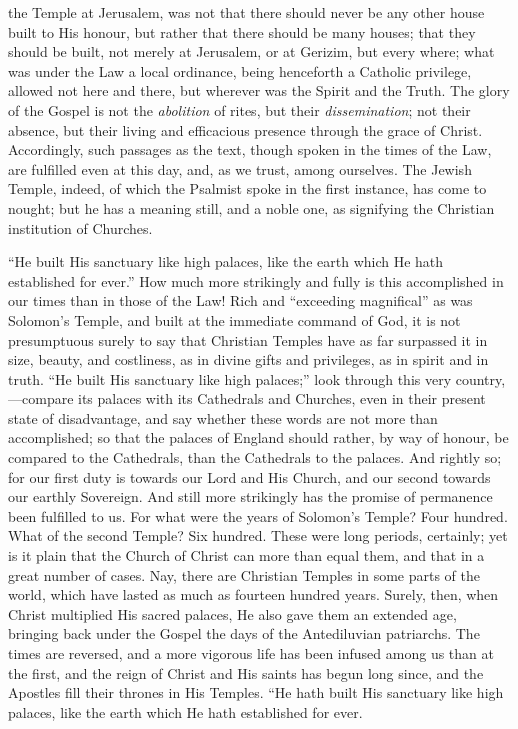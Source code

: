 the Temple at Jerusalem, was not that there should never be any other
house built to His honour, but rather that there should be many
houses; that they should be built, not merely at Jerusalem, or at
Gerizim, but every where; what was under the Law a local ordinance,
being henceforth a Catholic privilege, allowed not here and there, but
wherever was the Spirit and the Truth. The glory of the Gospel is not
the \emph{abolition} of rites, but their \emph{dissemination}; not
their absence, but their living and efficacious presence through the
grace of Christ. Accordingly, such passages as the text, though spoken
in the times of the Law, are fulfilled even at this day, and, as we
trust, among ourselves. The Jewish Temple, indeed, of which the
Psalmist spoke in the first instance, has come to nought; but he has a
meaning still, and a noble one, as signifying the Christian
institution of Churches.

``He built His sanctuary like high palaces, like the earth
which He hath established for ever.'' How much more strikingly and
fully is this accomplished in our times than in those of the Law! Rich
and ``exceeding magnifical'' as was Solomon's Temple, and
built at the immediate command of God, it is not presumptuous surely
to say that Christian Temples have as far surpassed it in size,
beauty, and costliness, as in divine gifts and privileges, as in
spirit and in truth. ``He built His sanctuary like high
palaces;'' look through this very country,—compare its palaces
with its Cathedrals and Churches, even in their present state of
disadvantage, and say whether these words are not more than
accomplished; so that the palaces of England should rather, by way of
honour, be compared to the Cathedrals, than the Cathedrals to the
palaces. And rightly so; for our first duty is towards our Lord and
His Church, and our second towards our earthly Sovereign. And still
more strikingly has the promise of permanence been fulfilled to us.
For what were the years of Solomon's Temple? Four hundred. What of the
second Temple? Six hundred. These were long periods, certainly; yet is
it plain that the Church of Christ can more than equal them, and that
in a great number of cases. Nay, there are Christian Temples in some
parts of the world, which have lasted as much as fourteen hundred
years. Surely, then, when Christ multiplied His sacred palaces, He
also gave them an extended age, bringing back under the Gospel the
days of the Antediluvian patriarchs. The times are reversed, and a
more vigorous life has been infused among us than at the first, and
the reign of Christ and His saints has begun long since, and the
Apostles fill their thrones in His Temples. ``He hath built His
sanctuary like high palaces, like the earth which He hath established
for ever.


